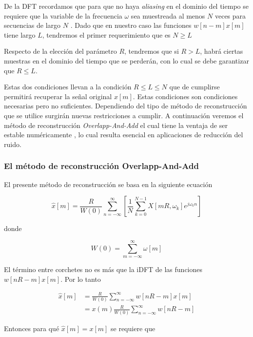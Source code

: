 De la DFT recordamos que para que no haya \emph{aliasing} en el dominio del tiempo se requiere que la variable de la frecuencia $\omega$ sea muestreada al menos $N$ veces para secuencias de largo $N$ \cite{oppenheim_schafer}. Dado que en nuestro caso las funciones $w[n-m] x[m]$ tiene largo $L$, tendremos el primer requerimiento que es $N \geq L$

Respecto de la elección del parámetro $R$, tendremos que si $R>L$, habrá ciertas muestras en el dominio del tiempo que se perderán, con lo cual se debe garantizar que $R \leq L$.

Estas dos condiciones llevan a la condición $R \leq L \leq N$ que de cumplirse permitirá recuperar la señal original $x[m]$. Estas condiciones son condiciones necesarias pero no suficientes. Dependiendo del tipo de método de reconstrucción que se utilice surgirán nuevas restricciones a cumplir. A continuación veremos el método de reconstrucción \emph{Overlapp-And-Add} el cual tiene la ventaja de ser estable numéricamente \cite{oppenheim_schafer}, lo cual resulta esencial en aplicaciones de reducción del ruido.

\subsubsection{El método de reconstrucción Overlapp-And-Add}
\label{sec:overlapp_and_and}

El presente método de reconstrucción se basa en la siguiente ecuación \cite{jae_sung_oppenheim}

\begin{equation*}
	\hat{x}[m] = \frac{R}{W(0)} \sum_{n=-\infty}^{\infty} \left[ \frac{1}{N} \sum_{k=0}^{N-1} X[mR, \omega_k] e^{j \omega_k n} \right]
\end{equation*}

donde 

\begin{equation*}
	W(0) = \sum_{m=-\infty}^{\infty} \omega[m]
\end{equation*}

El término entre corchetes no es más que la iDFT de las funciones $w[nR-m] x[m]$. Por lo tanto

\begin{align*}
	\hat{x}[m] &= \frac{R}{W(0)} \sum_{n=-\infty}^{\infty} w[nR-m] x[m] \\
	&= x(m) \frac{R}{W(0)} \sum_{n=-\infty}^{\infty} w[nR-m]
\end{align*}

Entonces para qué $\hat{x}[m] = x[m]$ se requiere que

